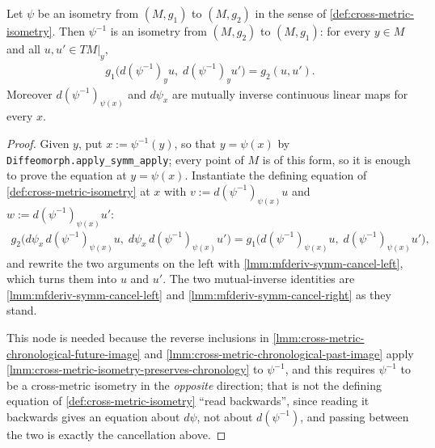\begin{lemma}
    \label{lmm:cross-metric-isometry-symm}
    \leanok
    Let $\psi$ be an isometry from $(M,g_1)$ to $(M,g_2)$ in the sense of \ref{def:cross-metric-isometry}. Then $\psi^{-1}$ is an isometry from $(M,g_2)$ to $(M,g_1)$: for every $y \in M$ and all $u, u' \in TM|_y$,
    \begin{align}
        g_1\big(d(\psi^{-1})_y u,\; d(\psi^{-1})_y u'\big) = g_2(u, u').
    \end{align}
    Moreover $d(\psi^{-1})_{\psi(x)}$ and $d\psi_x$ are mutually inverse continuous linear maps for every $x$.
\end{lemma}
\begin{proof}
    \leanok
    Given $y$, put $x := \psi^{-1}(y)$, so that $y = \psi(x)$ by \texttt{Diffeomorph.apply\_symm\_apply}; every point of $M$ is of this form, so it is enough to prove the equation at $y = \psi(x)$. Instantiate the defining equation of \ref{def:cross-metric-isometry} at $x$ with $v := d(\psi^{-1})_{\psi(x)}u$ and $w := d(\psi^{-1})_{\psi(x)}u'$:
    \begin{align}
        g_2\big(d\psi_x\,d(\psi^{-1})_{\psi(x)}u,\; d\psi_x\,d(\psi^{-1})_{\psi(x)}u'\big) = g_1\big(d(\psi^{-1})_{\psi(x)}u,\; d(\psi^{-1})_{\psi(x)}u'\big),
    \end{align}
    and rewrite the two arguments on the left with \ref{lmm:mfderiv-symm-cancel-left}, which turns them into $u$ and $u'$. The two mutual-inverse identities are \ref{lmm:mfderiv-symm-cancel-left} and \ref{lmm:mfderiv-symm-cancel-right} as they stand.

    This node is needed because the reverse inclusions in \ref{lmm:cross-metric-chronological-future-image} and \ref{lmm:cross-metric-chronological-past-image} apply \ref{lmm:cross-metric-isometry-preserves-chronology} to $\psi^{-1}$, and this requires $\psi^{-1}$ to be a cross-metric isometry in the \emph{opposite} direction; that is not the defining equation of \ref{def:cross-metric-isometry} ``read backwards'', since reading it backwards gives an equation about $d\psi$, not about $d(\psi^{-1})$, and passing between the two is exactly the cancellation above.
\end{proof}

